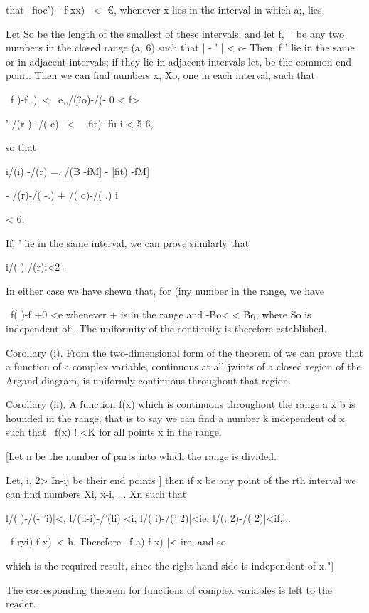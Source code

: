 that \ fioc') - f xx) \ < -€, whenever x lies in the interval in which
a;, lies.

Let So be the length of the smallest of these intervals; and let f,
|' be any two numbers in the closed range (a, 6) such that | - ' | <
o- Then, f ' lie in the same or in adjacent intervals; if they lie
in adjacent intervals let, be the common end point. Then we can find
numbers x, Xo, one in each interval, such that

\ f )-f .)\ < \ e,,/(?o)-/(- 0 < f>

' /(r ) -/( e) \ < \ \, fit) -fu i < 5 6,

so that

i/(i) -/(r) =, /(B -fM] - [fit) -fM]

- /(r)-/( -.) + /( o)-/( .) i

< 6.

If, ' lie in the same interval, we can prove similarly that

i/( )-/(r)i<2 -

In either case we have shewn that, for (iny number in the range, we
have

\ f( )-f +0 <e whenever + is in the range and -Bo< < Bq, where So is
independent of . The uniformity of the continuity is therefore
established.

Corollary (i). From the two-dimensional form of the theorem of 
we can prove that a function of a complex variable, continuous at all
jwints of a closed region of the Argand diagram, is uniformly
continuous throughout that region.

Corollary (ii). A function f(x) which is continuous throughout the
range a x b is hounded in the range; that is to say we can find a
number k independent of x such that \ f(x) ! <K for all points x in
the range.

[Let n be the number of parts into which the range is divided.

Let, i, 2>  In-ij be their end points ] then if x be any point of
the rth interval we can find numbers Xi, x-i, ... Xn such that

l/( )-/(- 'i)|<, l/(.i-i)-/'(li)|<i, l/( i)-/(' 2)|<ie, l/(. 2)-/(
2)|<if,...

 \ f ryi)-f x)\ < h. Therefore \ f a)-f x) |< ire, and so

which is the required result, since the right-hand side is independent
of x."]

The corresponding theorem for functions of complex variables is left
to the reader.

